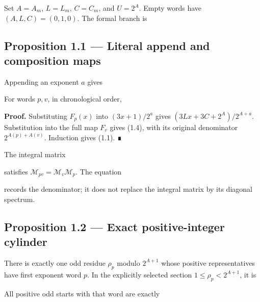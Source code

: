 Set \(A=A_m\), \(L=L_m\), \(C=C_m\), and \(U=2^A\). Empty words have
\((A,L,C)=(0,1,0)\). The formal branch is


\subsection{Proposition 1.1 --- Literal append and composition maps}

Appending an exponent \(a\) gives


For words \(p,v\), in chronological order,


\textbf{Proof.} Substituting \(F_p(x)\) into \((3x+1)/2^a\) gives
\((3Lx+3C+2^A)/2^{A+a}\). Substitution into the full map \(F_v\) gives
(1.4), with its original denominator \(2^{A(p)+A(v)}\). Induction gives
(1.1). ∎

The integral matrix


satisfies \(\mathcal M_{pv}=\mathcal M_v\mathcal M_p\). The equation


records the denominator; it does not replace the integral matrix by its
diagonal spectrum.

\subsection{Proposition 1.2 --- Exact positive-integer cylinder}

There is exactly one odd residue \(\rho_p\) modulo \(2^{A+1}\) whose
positive representatives have first exponent word \(p\). In the
explicitly selected section \(1\le\rho_p<2^{A+1}\), it is


All positive odd starts with that word are exactly


